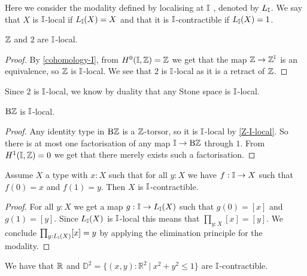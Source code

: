 Here we consider the modality defined by localising at $\mathbb{I}$ \cite{modalities}, denoted by $L_{\mathbb{I}}$. We say that $X$ is $\mathbb{I}$-local if $L_{\mathbb{I}}(X) = X$ and that it is $\mathbb{I}$-contractible if $L_{\mathbb{I}}(X)=1$.

\begin{lemma}\label{Z-I-local}
$\mathbb{Z}$ and $2$ are $\mathbb{I}$-local.
\end{lemma}

\begin{proof}
By \cref{cohomology-I}, from $H^0(\mathbb{I},\mathbb{Z})=\mathbb{Z}$ we get that the map $\mathbb{Z}\to \mathbb{Z}^{\mathbb{I}}$ is an equivalence, so $\mathbb{Z}$ is $\mathbb{I}$-local. We see that $2$ is $\mathbb{I}$-local as it is a retract of $\mathbb{Z}$.
\end{proof}

\begin{remark}
Since $2$ is $\mathbb{I}$-local, we know by duality that any Stone space is $\mathbb{I}$-local.
\end{remark}

\begin{lemma}\label{BZ-I-local}
$\mathrm{B}\mathbb{Z}$ is $\mathbb{I}$-local.
\end{lemma}

\begin{proof}
Any identity type in $\mathrm{B}\mathbb{Z}$ is a $\mathbb{Z}$-torsor, so it is $\mathbb{I}$-local by \cref{Z-I-local}. So there is at most one factorisation of any map $\mathbb{I}\to \mathrm{B}\mathbb{Z}$ through $1$. From $H^1(\mathbb{I},\mathbb{Z})=0$ we get that there merely exists such a factorisation.
\end{proof}

\begin{lemma}\label{continuously-path-connected-contractible}
Assume $X$ a type with $x:X$ such that for all $y:X$ we have $f:\mathbb{I}\to X$ such that $f(0)=x$ and $f(1)=y$. Then $X$ is $\mathbb{I}$-contractible.
\end{lemma}

\begin{proof}
For all $y:X$ we get a map $g:\mathbb{I}\to L_{\mathbb{I}}(X)$ such that $g(0) = [x]$ and $g(1)=[y]$. Since $L_{\mathbb{I}}(X)$ is $\mathbb{I}$-local this means that $\prod_{y:X}[x]=[y]$. We conclude $\prod_{y:L_{\mathbb{I}}(X)}[x]=y$ by applying the elimination principle for the modality.
\end{proof}

\begin{corollary}\label{R-I-contractible}
We have that $\mathbb{R}$ and $\mathbb{D}^2=\{(x,y):\mathbb R^2\ \vert\ x^2+y^2\leq 1\}$ are $\mathbb{I}$-contractible.
\end{corollary}

